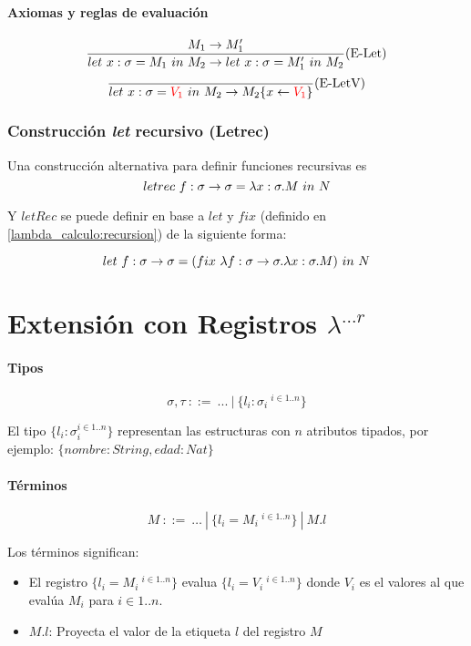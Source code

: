 \documentclass[10pt,a4paper]{article}
\begin{document}
\paragraph{Axiomas y reglas de evaluación}

\begin{equation*}
\frac{M_1\to M_1'}{let~x:\sigma = M_1~in~M_2\to let~x:\sigma = M'_1~in~M_2}(\text{E-Let})
\end{equation*}
\vspace*{5mm}
\begin{equation*}
\frac{}{let~x:\sigma = \color{red}V_1\color{black}~in~M_2\to M_2\{x\leftarrow\color{red}V_1\color{black}\}}(\text{E-LetV})
\end{equation*}

\subsubsection{Construcción \textit{let} recursivo (Letrec)}
Una construcción alternativa para definir funciones recursivas es 
$$letrec~f:\sigma\to\sigma = \lambda x: \sigma . M~in~N$$

Y $letRec$ se puede definir  en base a $let$ y $fix$ (definido en \ref{lambda_calculo:recursion}) de la siguiente forma:

$$let~f:\sigma\to\sigma = (fix~\lambda f: \sigma\to\sigma . \lambda x: \sigma . M)~in~N$$


\newpage
\section{Extensión con Registros \texorpdfstring{$\lambda^{...r}$}{lambda ...r+}}

\paragraph{Tipos}
$$\sigma, \tau ~::=~...~|~\{l_i : \sigma_i ~^{i\in 1..n}\}$$

El tipo $\{l_i : \sigma_i^{i\in 1..n}\}$ representan las estructuras con $n$ atributos tipados, por ejemplo: $\{nombre : String,edad:Nat\}$
\paragraph{Términos}
$$ M~::=~ \dots~|~\{l_i = M_i ~^{i\in 1..n}\}~|~M.l $$

Los términos significan:
\begin{itemize}
    \item El registro $\{l_i = M_i ~^{i\in 1..n}\}$ evalua $\{l_i = V_i ~^{i\in 1..n}\}$  donde $V_i$ es el valores al que evalúa $M_i$ para $i\in 1..n$.
    \item $M.l$: Proyecta el valor de la etiqueta $l$ del registro $M$
\end{itemize}
\end{document}
